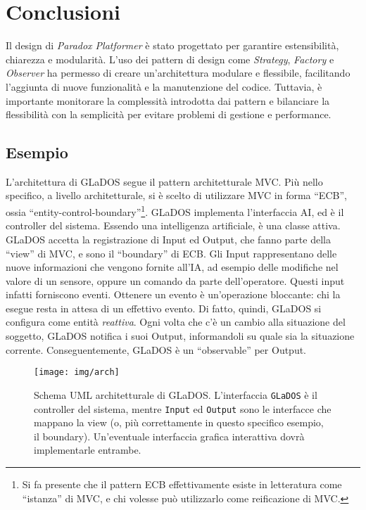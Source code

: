 \documentclass[a4paper,12pt]{report}
\begin{document}
	\section{Conclusioni}
	
	Il design di \textit{Paradox Platformer} è stato progettato per garantire estensibilità, chiarezza e modularità. L'uso dei pattern di design come \textit{Strategy}, \textit{Factory} e \textit{Observer} ha permesso di creare un'architettura modulare e flessibile, facilitando l'aggiunta di nuove funzionalità e la manutenzione del codice. Tuttavia, è importante monitorare la complessità introdotta dai pattern e bilanciare la flessibilità con la semplicità per evitare problemi di gestione e performance.
	
	
	
	\subsection*{Esempio}
	
	L'architettura di GLaDOS segue il pattern architetturale MVC.
	Più nello specifico, a livello architetturale, si è scelto di utilizzare MVC in forma ``ECB'', ossia ``entity-control-boundary''\footnote{
		Si fa presente che il pattern ECB effettivamente esiste in letteratura come ``istanza'' di MVC, e chi volesse può utilizzarlo come reificazione di MVC.
	}.
	GLaDOS implementa l'interfaccia AI, ed è il controller del sistema.
	Essendo una intelligenza artificiale, è una classe attiva.
	GLaDOS accetta la registrazione di Input ed Output, che fanno parte della ``view'' di MVC, e sono il ``boundary'' di ECB.
	Gli Input rappresentano delle nuove informazioni che vengono fornite all'IA, ad esempio delle modifiche nel valore di un sensore, oppure un comando da parte dell'operatore.
	Questi input infatti forniscono eventi.
	Ottenere un evento è un'operazione bloccante: chi la esegue resta in attesa di un effettivo evento.
	Di fatto, quindi, GLaDOS si configura come entità \textit{reattiva}.
	Ogni volta che c'è un cambio alla situazione del soggetto, GLaDOS notifica i suoi Output,
	informandoli su quale sia la situazione corrente.
	Conseguentemente, GLaDOS è un ``observable'' per Output.
	
	\begin{figure}[h]
		\centering{}
		\texttt{[image: img/arch]}
		\caption{Schema UML architetturale di GLaDOS. L'interfaccia \texttt{GLaDOS} è il controller del sistema, mentre \texttt{Input} ed \texttt{Output} sono le interfacce che mappano la view (o, più correttamente in questo specifico esempio, il boundary). Un'eventuale interfaccia grafica interattiva dovrà implementarle entrambe.}
		\label{img:goodarch}
	\end{figure}
	
\end{document}
